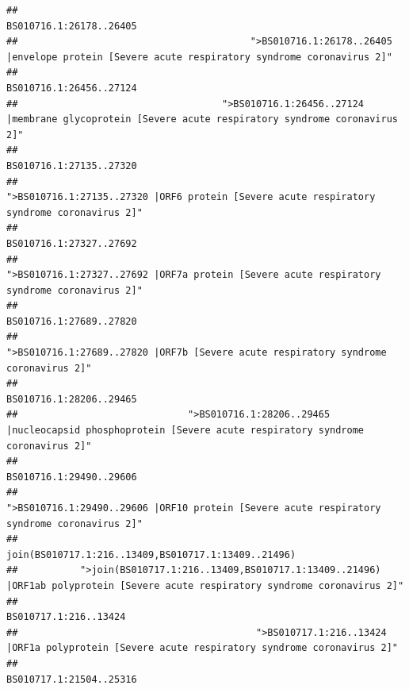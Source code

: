 \documentclass[
]{article}
\begin{document}
\begin{verbatim}
##                                                                                                                BS010716.1:26178..26405 
##                                         ">BS010716.1:26178..26405 |envelope protein [Severe acute respiratory syndrome coronavirus 2]" 
##                                                                                                                BS010716.1:26456..27124 
##                                    ">BS010716.1:26456..27124 |membrane glycoprotein [Severe acute respiratory syndrome coronavirus 2]" 
##                                                                                                                BS010716.1:27135..27320 
##                                             ">BS010716.1:27135..27320 |ORF6 protein [Severe acute respiratory syndrome coronavirus 2]" 
##                                                                                                                BS010716.1:27327..27692 
##                                            ">BS010716.1:27327..27692 |ORF7a protein [Severe acute respiratory syndrome coronavirus 2]" 
##                                                                                                                BS010716.1:27689..27820 
##                                                    ">BS010716.1:27689..27820 |ORF7b [Severe acute respiratory syndrome coronavirus 2]" 
##                                                                                                                BS010716.1:28206..29465 
##                              ">BS010716.1:28206..29465 |nucleocapsid phosphoprotein [Severe acute respiratory syndrome coronavirus 2]" 
##                                                                                                                BS010716.1:29490..29606 
##                                            ">BS010716.1:29490..29606 |ORF10 protein [Severe acute respiratory syndrome coronavirus 2]" 
##                                                                                    join(BS010717.1:216..13409,BS010717.1:13409..21496) 
##           ">join(BS010717.1:216..13409,BS010717.1:13409..21496) |ORF1ab polyprotein [Severe acute respiratory syndrome coronavirus 2]" 
##                                                                                                                  BS010717.1:216..13424 
##                                          ">BS010717.1:216..13424 |ORF1a polyprotein [Severe acute respiratory syndrome coronavirus 2]" 
##                                                                                                                BS010717.1:21504..25316 

\end{verbatim}
\end{document}

